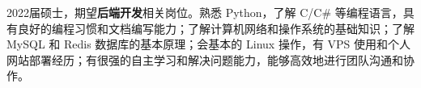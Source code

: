 {\onehalfspacing\hspace{2em}%
2022届硕士，期望\textbf{后端开发}相关岗位。熟悉 Python，了解 C/C\# 等编程语言，具有良好的编程习惯和文档编写能力；了解计算机网络和操作系统的基础知识；了解 MySQL 和 Redis 数据库的基本原理；会基本的 Linux 操作，有 VPS 使用和个人网站部署经历；有很强的自主学习和解决问题能力，能够高效地进行团队沟通和协作。
\par}